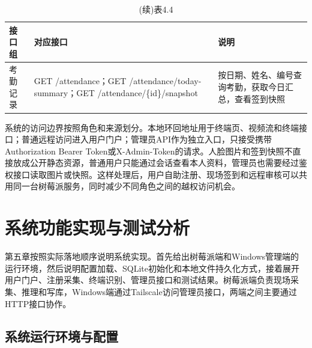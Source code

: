 \documentclass[UTF8]{heuthesis}
\begin{document}
\begingroup
\small
\begin{longtable}{|>{\raggedright\arraybackslash}p{}|>{\raggedright\arraybackslash}p{}|>{\raggedright\arraybackslash}p{}|}
\caption{(续)表4.4}\\
\hline
接口组 & 对应接口 & 说明 \\
\hline
考勤记录 & GET /attendance；GET /attendance/today-summary；GET /attendance/\{id\}/snapshot & 按日期、姓名、编号查询考勤，获取今日汇总，查看签到快照 \\
\hline
\end{longtable}
\endgroup

系统的访问边界按照角色和来源划分。本地环回地址用于终端页、视频流和终端接口；普通远程访问进入用户门户；管理员API作为独立入口，只接受携带Authorization Bearer Token或X-Admin-Token的请求。人脸图片和签到快照不直接放成公开静态资源，普通用户只能通过会话查看本人资料，管理员也需要经过鉴权接口读取图片或快照。这样处理后，用户自助注册、现场签到和远程审核可以共用同一台树莓派服务，同时减少不同角色之间的越权访问机会。

\chapter{系统功能实现与测试分析}
第五章按照实际落地顺序说明系统实现。首先给出树莓派端和Windows管理端的运行环境，然后说明配置加载、SQLite初始化和本地文件持久化方式，接着展开用户门户、注册采集、终端识别、管理员接口和测试结果。树莓派端负责现场采集、推理和写库，Windows端通过Tailscale访问管理员接口，两端之间主要通过HTTP接口协作。

\section{系统运行环境与配置}
\end{document}
